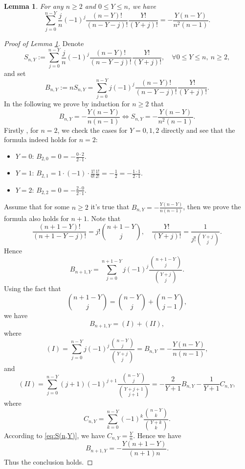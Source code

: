 \documentclass[12pt,letterpaper]{article}
\newtheorem{lemma}{Lemma}[section]
\begin{document}
\begin{lemma}\label{lemma:combinatorics:2}
For any $n\geq2$ and $0\leq Y\leq n$, we have 
$$\sum_{j=0}^{n-Y}\frac{j}{n}(-1)^j\frac{(n-Y)!}{(n-Y-j)!}\frac{Y!}{(Y+j)!}=-\frac{Y(n-Y)}{n^2(n-1)}.$$
\end{lemma}
\begin{proof}[Proof of Lemma \ref{lemma:combinatorics:2}]
Denote 
$$S_{n,Y}:=\sum_{j=0}^{n-Y}\frac{j}{n}(-1)^j\frac{(n-Y)!}{(n-Y-j)!}\frac{Y!}{(Y+j)!},\quad \forall 0\leq Y\leq n,\ n\geq2,$$
and set 
$$B_{n,Y}:=nS_{n,Y}=\sum_{j=0}^{n-Y}j(-1)^j\frac{(n-Y)!}{(n-Y-j)!}\frac{Y!}{(Y+j)!}.$$
In the following we prove by induction for $n\geq2$ that 
$$B_{n,Y}=-\frac{Y(n-Y)}{n(n-1)}\iff S_{n,Y}=-\frac{Y(n-Y)}{n^2(n-1)}.$$
Firstly , for $n=2$, we check the cases for $Y=0,1,2$ directly and see that the formula indeed holds for $n=2$:
\begin{itemize}
    \item $Y=0$: $B_{2,0}=0 = -\tfrac{0\cdot 2}{2\cdot 1}$.
    \item $Y=1$: $B_{2,1} = 1\cdot(-1)\cdot \tfrac{1!}{0!}\tfrac{1!}{2!} = -\tfrac{1}{2} = -\tfrac{1\cdot 1}{2\cdot 1}$.
    \item $Y=2$: $B_{2,2}=0 = -\tfrac{2\cdot 0}{2\cdot 1}$.
\end{itemize}
Assume that for some $n\geq2$ it's true that $B_{n,Y}=-\tfrac{Y(n-Y)}{n(n-1)}$, then we prove the formula also holds for $n+1$. Note that 
$$\frac{(n+1-Y)!}{(n+1-Y-j)!}=j!{n+1-Y\choose j},\quad \frac{Y!}{(Y+j)!}=\frac{1}{j!{Y+j\choose j}}.$$
Hence 
$$B_{n+1,Y}=\sum_{j=0}^{n+1-Y}j(-1)^j\frac{{n+1-Y\choose j}}{{Y+j\choose j}}.$$
Using the fact that 
$$\binom{n+1-Y}{j}=\binom{n-Y}{j}+\binom{n-Y}{j-1},$$
we have 
$$B_{n+1,Y}=(I)+(II),$$
where 
$$(I)=\sum_{j=0}^{n-Y}j(-1)^j\frac{\binom{n-Y}{j}}{\binom{Y+j}{j}}=B_{n,Y}=-\frac{Y(n-Y)}{n(n-1)},$$
and
$$(II)=\sum_{j=0}^{n-Y}(j+1)(-1)^{j+1}\frac{\binom{n-Y}{j}}{\binom{Y+j+1}{j+1}}=-\frac{2}{Y+1}B_{n,Y}-\frac{1}{Y+1}C_{n,Y},$$
where 
$$C_{n,Y}=\sum_{k=0}^{n-Y}(-1)^k\frac{\binom{n-Y}{k}}{\binom{Y+k}{k}}.$$
According to \eqref{eq:S(n,Y)}, we have $C_{n,Y}=\tfrac{Y}{n}$. Hence we have 
$$B_{n+1,Y}=-\frac{Y(n+1-Y)}{(n+1)n}.$$
Thus the conclusion holds.
\end{proof}

\end{document}
